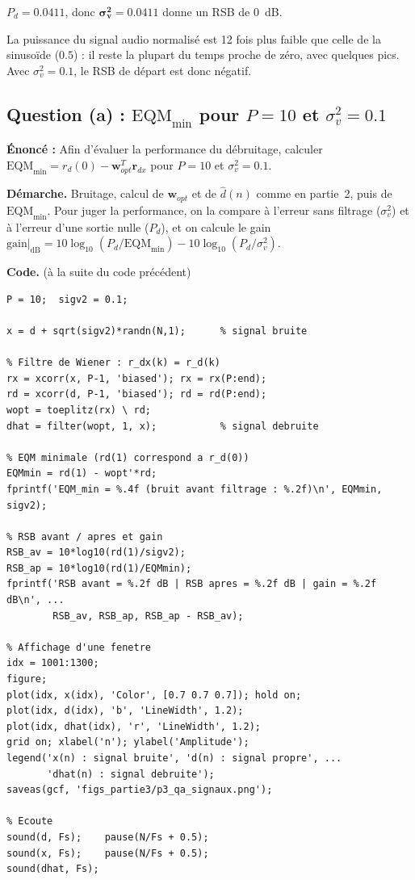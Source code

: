 \begin{resultat}
$P_d=0.0411$, donc $\boldsymbol{\sigma_v^2=0.0411}$ donne un RSB de 0~dB.
\end{resultat}

\begin{interpretation}
La puissance du signal audio normalisé est 12 fois plus faible que celle de la sinusoïde ($0.5$) : il reste la plupart du temps proche de zéro, avec quelques pics. Avec $\sigma_v^2=0.1$, le RSB de départ est donc négatif.
\end{interpretation}

\subsection{Question (a) : \texorpdfstring{$\mathrm{EQM}_{\min}$ pour $P=10$ et $\sigma_v^2=0.1$}{EQMmin pour P = 10}}

\begin{enonce}
\textbf{Énoncé :} Afin d'évaluer la performance du débruitage, calculer $\mathrm{EQM}_{\min}=r_d(0)-\mathbf{w}_{opt}^T\mathbf{r}_{dx}$ pour $P=10$ et $\sigma_v^2=0.1$.
\end{enonce}

\textbf{Démarche.} Bruitage, calcul de $\mathbf{w}_{opt}$ et de $\hat d(n)$ comme en partie~2, puis de $\mathrm{EQM}_{\min}$. Pour juger la performance, on la compare à l'erreur sans filtrage ($\sigma_v^2$) et à l'erreur d'une sortie nulle ($P_d$), et on calcule le gain $\mathrm{gain}|_{\mathrm{dB}}=10\log_{10}(P_d/\mathrm{EQM}_{\min})-10\log_{10}(P_d/\sigma_v^2)$.

\textbf{Code.} (à la suite du code précédent)
\begin{lstlisting}
P = 10;  sigv2 = 0.1;

x = d + sqrt(sigv2)*randn(N,1);      % signal bruite

% Filtre de Wiener : r_dx(k) = r_d(k)
rx = xcorr(x, P-1, 'biased'); rx = rx(P:end);
rd = xcorr(d, P-1, 'biased'); rd = rd(P:end);
wopt = toeplitz(rx) \ rd;
dhat = filter(wopt, 1, x);           % signal debruite

% EQM minimale (rd(1) correspond a r_d(0))
EQMmin = rd(1) - wopt'*rd;
fprintf('EQM_min = %.4f (bruit avant filtrage : %.2f)\n', EQMmin, sigv2);

% RSB avant / apres et gain
RSB_av = 10*log10(rd(1)/sigv2);
RSB_ap = 10*log10(rd(1)/EQMmin);
fprintf('RSB avant = %.2f dB | RSB apres = %.2f dB | gain = %.2f dB\n', ...
        RSB_av, RSB_ap, RSB_ap - RSB_av);

% Affichage d'une fenetre
idx = 1001:1300;
figure;
plot(idx, x(idx), 'Color', [0.7 0.7 0.7]); hold on;
plot(idx, d(idx), 'b', 'LineWidth', 1.2);
plot(idx, dhat(idx), 'r', 'LineWidth', 1.2);
grid on; xlabel('n'); ylabel('Amplitude');
legend('x(n) : signal bruite', 'd(n) : signal propre', ...
       'dhat(n) : signal debruite');
saveas(gcf, 'figs_partie3/p3_qa_signaux.png');

% Ecoute
sound(d, Fs);    pause(N/Fs + 0.5);
sound(x, Fs);    pause(N/Fs + 0.5);
sound(dhat, Fs);
\end{lstlisting}

